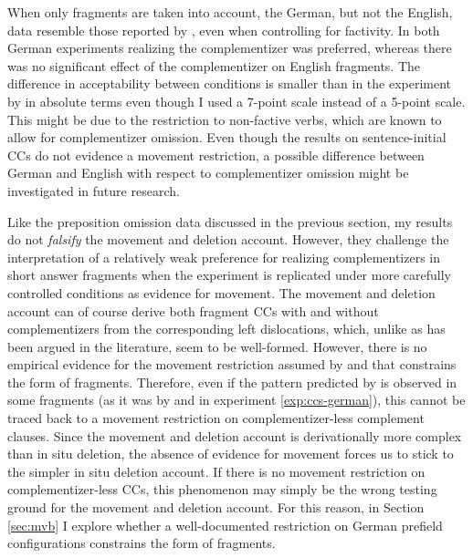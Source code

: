 When only fragments are taken into account, the German, but not the English, data resemble those reported by \citet{merchant.etal2013}, even when controlling for factivity. In both German experiments realizing the complementizer was preferred, whereas there was no significant effect of the complementizer on English fragments. The difference in acceptability between conditions is smaller than in the experiment by \citet{merchant.etal2013} in absolute terms even though I used a 7-point scale instead of a 5-point scale. This might be due to the restriction to non-factive verbs, which are known to allow for complementizer omission. Even though the results on sentence-initial CCs do not evidence a movement restriction, a possible difference between German and English with respect to complementizer omission might be investigated in future research.

Like the preposition omission data discussed in the previous section, my results do not \textit{falsify} the movement and deletion account. However, they challenge the interpretation of a relatively weak preference for realizing complementizers in short answer fragments when the experiment is replicated under more carefully controlled conditions as evidence for movement. The movement and deletion account can of course derive both fragment CCs with and without complementizers from the corresponding left dislocations, which, unlike as has been argued in the literature, seem to be well-formed. However, there is no empirical evidence for the movement restriction assumed by \citet{merchant2004} and \citet{merchant.etal2013} that constrains the form of fragments. Therefore, even if the pattern predicted by \citet{merchant2004} is observed in some fragments (as it was by \citet{merchant.etal2013} and in experiment \ref{exp:ccs-german}), this cannot be traced back to a movement restriction on complementizer-less complement clauses. Since the movement and deletion account is derivationally more complex than in situ deletion, the absence of evidence for movement forces us to stick to the simpler in situ deletion account. If there is no movement restriction on complementizer-less CCs, this phenomenon may simply be the wrong testing ground for the movement and deletion account. For this reason, in Section \ref{sec:mvb} I explore whether a well-documented restriction on German prefield configurations constrains the form of fragments.

